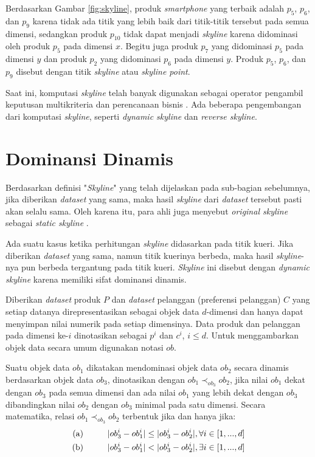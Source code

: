 \pagebreak
Berdasarkan Gambar \ref{fig:skyline}, produk \textit{smartphone} yang terbaik adalah $p_5$, $p_6$, dan $p_9$ karena tidak ada titik yang lebih baik dari titik-titik tersebut pada semua dimensi, sedangkan produk $p_{10}$ tidak dapat menjadi \textit{skyline} karena didominasi oleh produk $p_5$ pada dimensi $x$. Begitu juga produk $p_7$ yang didominasi $p_5$ pada dimensi $y$ dan produk $p_2$ yang didominasi $p_6$ pada dimensi $y$. Produk $p_5$, $p_6$, dan $p_9$ disebut dengan titik \textit{skyline} atau \textit{skyline point}.

Saat ini, komputasi \textit{skyline} telah banyak digunakan sebagai operator pengambil keputusan multikriteria dan perencanaan bisnis \cite{dynamic-skyline-2}. Ada beberapa pengembangan dari komputasi \textit{skyline}, seperti \textit{dynamic skyline} dan \textit{reverse skyline}.  

\section{Dominansi Dinamis}

\tab Berdasarkan definisi "\textit{Skyline}" yang telah dijelaskan pada sub-bagian sebelumnya, jika diberikan \textit{dataset} yang sama, maka hasil \textit{skyline} dari \textit{dataset} tersebut pasti akan selalu sama. Oleh karena itu, para ahli juga menyebut \textit{original skyline} sebagai \textit{static skyline} \cite{dynamic-skyline-2}.

Ada suatu kasus ketika perhitungan \textit{skyline} didasarkan pada titik kueri. Jika diberikan \textit{dataset} yang sama, namun titik kuerinya berbeda, maka hasil \textit{skyline}-nya pun berbeda tergantung pada titik kueri. \textit{Skyline} ini disebut dengan \textit{dynamic skyline} karena memiliki sifat dominansi dinamis. 

Diberikan \textit{dataset} produk $P$ dan \textit{dataset} pelanggan (preferensi pelanggan) $C$ yang setiap datanya direpresentasikan sebagai objek data $d$-dimensi dan hanya dapat menyimpan nilai numerik pada setiap dimensinya. Data produk dan pelanggan pada dimensi ke-$i$ dinotasikan sebagai $p^i$ dan $c^i$, $i \leq d$. Untuk menggambarkan objek data secara umum digunakan notasi $ob$.

\pagebreak
Suatu objek data $ob_1$ dikatakan mendominasi objek data $ob_2$ secara dinamis berdasarkan objek data $ob_3$, dinotasikan dengan $ob_1 \prec_{ob_3} ob_2$, jika nilai $ob_1$ dekat dengan $ob_3$ pada semua dimensi dan ada nilai $ob_1$ yang lebih dekat dengan $ob_3$ dibandingkan nilai $ob_2$ dengan $ob_3$ minimal pada satu dimensi. Secara matematika, relasi $ob_1 \prec_{ob_3} ob_2$ terbentuk jika dan hanya jika:
\begin{equation}\label{eq:syarat-dominansi-dinamis}
\begin{split}
\text{(a)} \hspace*{1cm} |ob_3^i - ob_1^i| \leq |ob_3^i - ob_2^i|, \forall i \in [1, ..., d] \\
\text{(b)} \hspace*{1cm} |ob_3^i - ob_1^i| < |ob_3^i - ob_2^i|, \exists i \in [1, ..., d]
\end{split}
\end{equation}

